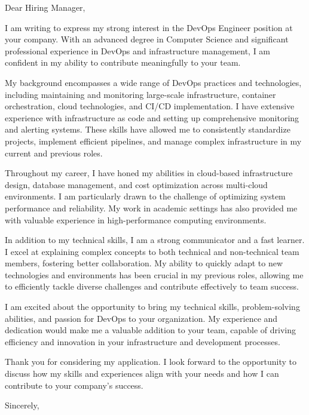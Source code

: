 \documentclass[]{main}
\begin{document}
\begin{letter}{}
    \vspace*{-15\baselineskip}
    \opening{Dear Hiring Manager,}
    \vspace{1em}

    I am writing to express my strong interest in the DevOps Engineer position at your company. With an advanced degree in Computer Science and significant professional experience in DevOps and infrastructure management, I am confident in my ability to contribute meaningfully to your team.

    My background encompasses a wide range of DevOps practices and technologies, including maintaining and monitoring large-scale infrastructure, container orchestration, cloud technologies, and CI/CD implementation. I have extensive experience with infrastructure as code and setting up comprehensive monitoring and alerting systems. These skills have allowed me to consistently standardize projects, implement efficient pipelines, and manage complex infrastructure in my current and previous roles.

    Throughout my career, I have honed my abilities in cloud-based infrastructure design, database management, and cost optimization across multi-cloud environments. I am particularly drawn to the challenge of optimizing system performance and reliability. My work in academic settings has also provided me with valuable experience in high-performance computing environments.

    In addition to my technical skills, I am a strong communicator and a fast learner. I excel at explaining complex concepts to both technical and non-technical team members, fostering better collaboration. My ability to quickly adapt to new technologies and environments has been crucial in my previous roles, allowing me to efficiently tackle diverse challenges and contribute effectively to team success.

    I am excited about the opportunity to bring my technical skills, problem-solving abilities, and passion for DevOps to your organization. My experience and dedication would make me a valuable addition to your team, capable of driving efficiency and innovation in your infrastructure and development processes.

    Thank you for considering my application. I look forward to the opportunity to discuss how my skills and experiences align with your needs and how I can contribute to your company's success.

    \vspace{3em}
    \closing{Sincerely,\\\name}
\end{letter}
\end{document}

